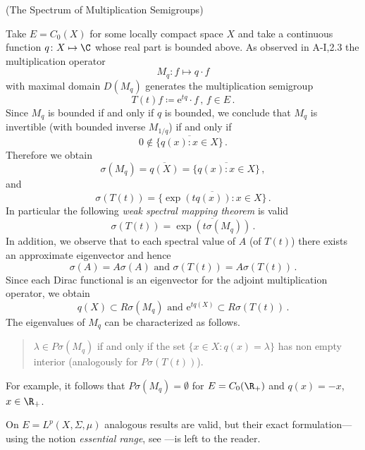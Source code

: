 \begin{example}{(The Spectrum of Multiplication Semigroups)}\label{ex:a3-2.3}

Take $E = C_{0}(X)$ for some locally compact space $X$ and take a continuous function $q \colon X \mapsto \C$ whose real part is bounded above.
As observed in A-I,2.3 the multiplication operator
\[
M_{q} \colon f \mapsto q \cdot f
\]
with maximal domain $D(M_{q})$ generates the multiplication semigroup
\[
T(t)f \coloneqq \mathrm{e}^{tq} \cdot f \, , \, f \in E\,.
\]
Since $M_{q}$ is bounded if and only if $q$ is bounded, we conclude that $M_{q}$ is invertible (with bounded inverse $M_{1/q}$) if and only if
\[
0 \notin \overline{\{q(x)  \colon x \in X\}}\,.
\]
Therefore we obtain
\[
\sigma(M_{q}) = \overline{q(X)} = \overline{\{q(x) \colon x \in X\}}\,,
\]
and
\[
\sigma(T(t)) = \overline{\{\exp(tq(x)) \colon x \in X\}}\,.
\]
In particular the following \emph{weak spectral mapping theorem} is valid
\[
\sigma(T(t)) = \overline{\exp(t\sigma(M_{q}))}\,.
\]
In addition, we observe that to each spectral value of $A$ (\resp of $T(t)$) there exists an approximate eigenvector and hence
\[
\sigma(A) = A\sigma(A) \text{ and } \sigma(T(t)) = A\sigma(T(t))\,.
\]
Since each Dirac functional is an eigenvector for the adjoint multiplication operator, we obtain
\[
q(X) \subset R\sigma(M_{q}) \text{ and } \mathrm{e}^{tq(X)} \subset R\sigma(T(t))\,.
\]
The eigenvalues of $M_{q}$ can be characterized as follows.
\begin{quote}
$\lambda \in P\sigma(M_{q})$ if and only if the set $\{x \in X \colon q(x) = \lambda\}$ has non empty interior (analogously for $P\sigma(T(t))$).
\end{quote}
For example, it follows that $P\sigma(M_{q}) = \emptyset$ for $E = C_{0}(\R_{+})$ and $q(x) = -x$, $x \in \R_{+}$.

On $E = L^{p}(X,\Sigma,\mu)$ analogous results are valid, but their exact formulation---using the notion \emph{essential range}, see \citet{goldstein:1985a}---is left to the reader.
\end{example}
